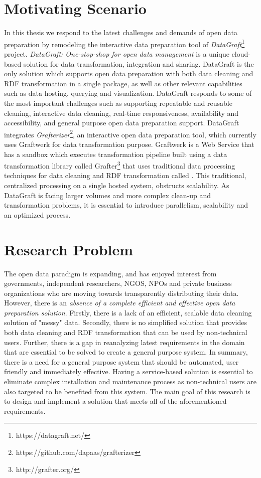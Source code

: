\section{Motivating Scenario}
\noindent In this thesis we respond to the latest challenges and demands of open data preparation by remodeling the interactive data preparation tool of \textit{DataGraft}\footnote{https://datagraft.net/} project. \textit{DataGraft: One-stop-shop for open data management} \cite{onestopshotforopendata}  is a unique cloud-based solution for data transformation, integration and sharing. DataGraft is the only solution which supports open data preparation with both data cleaning and RDF transformation in a single package, as well as other relevant capabilities such as data hosting, querying and visualization. DataGraft responds to some of the most important challenges such as supporting repeatable and reusable cleaning, interactive data cleaning, real-time responsiveness, availability and accessibility, and general purpose open data preparation support. DataGraft integrates \textit{Grafterizer}\footnote{https://github.com/dapaas/grafterizer}, an interactive open data preparation tool, which currently uses Graftwerk for data transformation purpose. Graftwerk is a Web Service that has a sandbox which executes transformation pipeline built using a data transformation library called Grafter\footnote{http://grafter.org/} that uses traditional data processing techniques for data cleaning and RDF transformation called . This traditional, centralized processing on a single hosted system, obstructs scalability. As DataGraft is facing larger volumes and more complex clean-up and transformation problems, it is essential to introduce parallelism, scalability and an optimized process. 
\section{Research Problem}
\label{sec:researchproblem}
\noindent The open data paradigm is expanding, and has enjoyed interest from governments, independent researchers, NGOS, NPOs and private business organizations who are moving towards transparently distributing their data. However, there is an \textit{absence of a complete efficient and effective open data preparation solution}. Firstly, there is a lack of an efficient, scalable data cleaning solution of "messy" data. Secondly, there is no simplified solution that provides both data cleaning and RDF transformation that can be used by non-technical users. Further, there is a gap in reanalyzing latest requirements in the domain that are essential to be solved to create a general purpose system. In summary, there is a need for a general purpose system that should be automated, user friendly and immediately effective. Having a service-based solution is essential to eliminate complex installation and maintenance process as non-technical users are also targeted to be benefited from this system. The main goal of this research is to design and implement a solution that meets all of the aforementioned requirements. 
